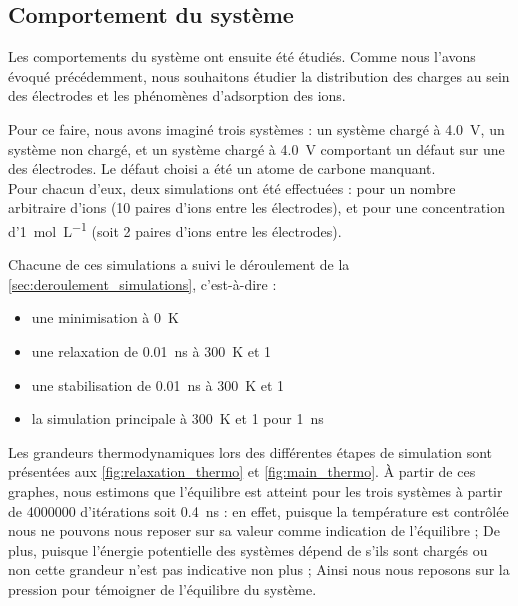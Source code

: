     \subsection{Comportement du système}

Les comportements du système ont ensuite été étudiés. Comme nous l'avons évoqué précédemment, nous souhaitons étudier la distribution des charges au sein des électrodes et les phénomènes d'adsorption des ions.

Pour ce faire, nous avons imaginé trois systèmes : un système chargé à \qty{4.0}{\volt}, un système non chargé, et un système chargé à \qty{4.0}{\volt} comportant un défaut sur une des électrodes. Le défaut choisi a été un atome de carbone manquant.\\
Pour chacun d'eux, deux simulations ont été effectuées : pour un nombre arbitraire d'ions (\num{10} paires d'ions entre les électrodes), et pour une concentration d'\qty{1}{\mole \per \liter} (soit \num{2} paires d'ions entre les électrodes).

Chacune de ces simulations a suivi le déroulement de la \autoref{sec:deroulement_simulations}, c'est-à-dire :
\begin{itemize}
    \item une minimisation à \qty{0}{\kelvin}
    \item une relaxation de \qty{0.01}{\nano \second} à \qty{300}{\kelvin} et \qty{1}{\atm}
    \item une stabilisation de \qty{0.01}{\nano \second} à \qty{300}{\kelvin} et \qty{1}{\atm}
    \item la simulation principale à \qty{300}{\kelvin} et \qty{1}{\atm} pour \qty{1}{\nano \second}
\end{itemize}

Les grandeurs thermodynamiques lors des différentes étapes de simulation sont présentées aux \autoref{fig:relaxation_thermo} et \ref{fig:main_thermo}. À partir de ces graphes, nous estimons que l'équilibre est atteint pour les trois systèmes à partir de \num{4000000} d'itérations soit \qty{0.4}{\nano \second} : en effet, puisque la température est contrôlée nous ne pouvons nous reposer sur sa valeur comme indication de l'équilibre ; De plus, puisque l'énergie potentielle des systèmes dépend de s'ils sont chargés ou non cette grandeur n'est pas indicative non plus ; Ainsi nous nous reposons sur la pression pour témoigner de l'équilibre du système.

